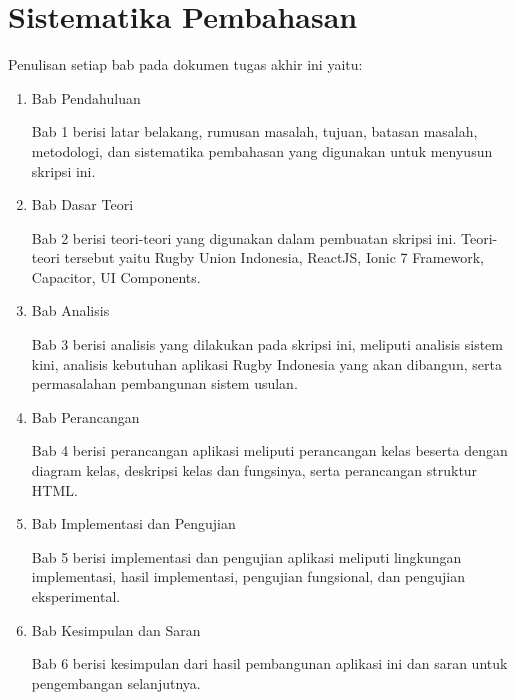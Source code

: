
\section{Sistematika Pembahasan}
\label{sec:sispem}
Penulisan setiap bab pada dokumen tugas akhir ini yaitu:
\begin{enumerate}
    \item Bab Pendahuluan
    
    Bab 1 berisi latar belakang, rumusan masalah, tujuan, batasan masalah, metodologi, dan sistematika pembahasan yang digunakan untuk menyusun skripsi ini.

    \item Bab Dasar Teori
    
    Bab 2 berisi teori-teori yang digunakan dalam pembuatan skripsi ini. Teori-teori tersebut yaitu Rugby Union Indonesia, ReactJS, Ionic 7 Framework, Capacitor, UI Components.

    \item Bab Analisis
    
    Bab 3 berisi analisis yang dilakukan pada skripsi ini, meliputi analisis sistem kini, analisis kebutuhan aplikasi Rugby Indonesia yang akan dibangun, serta permasalahan pembangunan sistem usulan.

    \item Bab Perancangan
    
    Bab 4 berisi perancangan aplikasi meliputi perancangan kelas beserta dengan diagram kelas, deskripsi kelas dan fungsinya, serta perancangan struktur HTML.

    \item Bab Implementasi dan Pengujian
    
    Bab 5 berisi implementasi dan pengujian aplikasi meliputi lingkungan implementasi, hasil implementasi, pengujian fungsional, dan pengujian eksperimental.
    
    \item Bab Kesimpulan dan Saran
    
    Bab 6 berisi kesimpulan dari hasil pembangunan aplikasi ini dan saran untuk pengembangan selanjutnya.
\end{enumerate}

